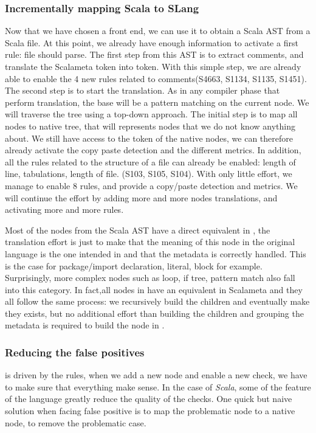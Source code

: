 \subsubsection{Incrementally mapping Scala to SLang}
\label{subsubsec:scala_to_slang}
Now that we have chosen a front end, we can use it to obtain a Scala AST from a Scala file. At this point, we already have enough information to activate a first rule: file should parse.
The first step from this AST is to extract comments, and translate the Scalameta token into \slang{} token.
With this simple step, we are already able to enable the 4 new rules related to comments(S4663, S1134, S1135, S1451).
The second step is to start the translation. As in any compiler phase that perform translation, the base will be a pattern matching on the current node. 
We will traverse the tree using a top-down approach. 
The initial step is to map all nodes to native tree, that will represents nodes that we do not know anything about. 
We still have access to the token of the native nodes, we can therefore already activate the copy paste detection and the different metrics. 
In addition, all the rules related to the structure of a file can already be enabled: length of line, tabulations, length of file. (S103, S105, S104).
With only little effort, we manage to enable 8 rules, and provide a copy/paste detection and metrics. 
We will continue the effort by adding more and more nodes translations, and activating more and more rules.

Most of the nodes from the Scala AST have a direct equivalent in \slang{}, the translation effort is just to make \slang{} that the meaning of this node in the original language is the one intended in \slang{} and that the metadata is correctly handled. This is the case for package/import declaration, literal, block for example. Surprisingly, more complex nodes such as loop, if tree, pattern match also fall into this category.
In fact,all nodes in \slang{} have an equivalent in Scalameta and they all follow the same process: we recursively build the children and eventually make \slang{} they exists, but no additional effort than building the children and grouping the metadata is required to build the node in \slang{}.

\subsubsection{Reducing the false positives}
\label{subsubsec:reducing_false_positives}

\slang{} is driven by the rules, when we add a new node and enable a new check, we have to make sure that everything make sense. 
In the case of \emph{Scala}, some of the feature of the language greatly reduce the quality of the checks.
One quick but naive solution when facing false positive is to map the problematic node to a native node, to remove the problematic case.

